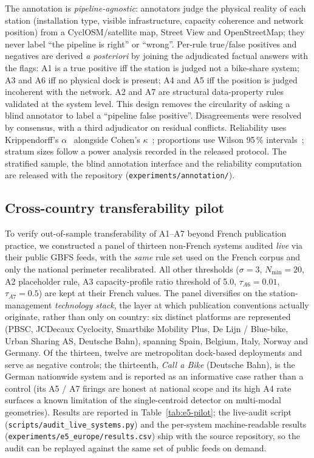 \documentclass[11pt,a4paper]{article}
\begin{document}
The annotation is \emph{pipeline-agnostic}: annotators judge the
physical reality of each station (installation type, visible
infrastructure, capacity coherence and network position) from a
CyclOSM/satellite map, Street View and OpenStreetMap; they never label
``the pipeline is right'' or ``wrong''. Per-rule true/false positives and
negatives are derived \emph{a posteriori} by joining the adjudicated
factual answers with the flags: A1 is a true positive iff the station is
judged not a bike-share system; A3 and A6 iff no physical dock is present;
A4 and A5 iff the position is judged incoherent with the network. A2 and A7
are structural data-property rules validated at the system level. This
design removes the circularity of asking a blind annotator to label a
``pipeline false positive''. Disagreements were resolved by consensus,
with a third adjudicator on residual conflicts. Reliability uses
Krippendorff's $\alpha$~\cite{Krippendorff2018Content} alongside Cohen's
$\kappa$~\cite{Cohen1960Kappa, ArtsteinPoesio2008}; proportions use Wilson
95\,\% intervals~\cite{Wilson1927Interval}; stratum sizes follow a
power analysis recorded in the released protocol. The stratified sample,
the blind annotation interface and the reliability computation are released
with the repository (\texttt{experiments/annotation/}).

\subsection{Cross-country transferability pilot}
To verify out-of-sample transferability of A1--A7 beyond French
publication practice, we constructed a panel of thirteen non-French
systems audited \emph{live} via their public GBFS feeds, with the
\emph{same} rule set used on the French corpus and only the
national perimeter recalibrated. All other thresholds ($\sigma =
3$, $N_{\min} = 20$, A2 placeholder rule, A3 capacity-profile
ratio threshold of 5.0, $\tau_{A6} = 0.01$, $\tau_{A7} = 0.5$) are
kept at their French values. The panel diversifies on the
station-management \emph{technology stack}, the layer at which
publication conventions actually originate, rather than only on
country: six distinct platforms are represented (PBSC, JCDecaux
Cyclocity, Smartbike Mobility Plus, De Lijn / Blue-bike, Urban
Sharing AS, Deutsche Bahn), spanning Spain, Belgium, Italy,
Norway and Germany. Of the thirteen, twelve are metropolitan
dock-based deployments and serve as negative controls; the
thirteenth, \emph{Call a Bike} (Deutsche Bahn), is the German
nationwide system and is reported as an informative case rather
than a control (its A5 / A7 firings are honest at national scope
and its high A4 rate surfaces a known limitation of the
single-centroid detector on multi-modal geometries). Results are
reported in Table~\ref{tab:e5-pilot}; the live-audit script
(\texttt{scripts/audit\_live\_systems.py}) and the per-system
machine-readable results
(\texttt{experiments/e5\_europe/results.csv}) ship with the source
repository, so the audit can be replayed against the same set of
public feeds on demand.
\end{document}

